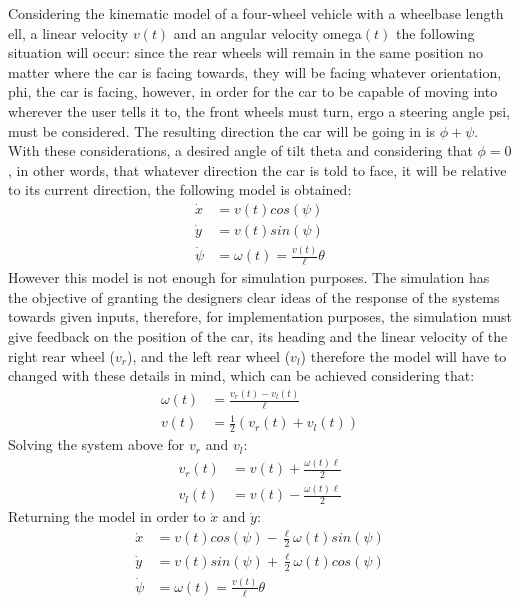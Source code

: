 Considering the kinematic model of a four-wheel vehicle with a wheelbase length \gls{ell}, a linear velocity $v(t)$ and an angular velocity \gls{omega}$(t)$ the following situation will occur: since the rear wheels will remain in the same position no matter where the car is facing towards, they will be facing whatever orientation, \gls{phi}, the car is facing, however, in order for the car to be capable of moving into wherever the user tells it to, the front wheels must turn, ergo a steering angle \gls{psi}, must be considered. The resulting direction the car will be going in is $\phi + \psi$. With these considerations, a desired angle of tilt \gls{theta} and considering that $\phi=0$, in other words, that whatever direction the car is told to face, it will be relative to its current direction, the following model is obtained:
\begin{align}
\dot{x}&=v(t) cos(\psi)\\
\dot{y}&=v(t) sin(\psi)\\
\dot{\psi}&=\omega(t)=\frac{v(t)}{\ell}\theta
\end{align}
However this model is not enough for simulation purposes. The simulation has the objective of granting the designers clear ideas of the response of the systems towards given inputs, therefore, for implementation purposes, the simulation must give feedback on the position of the car, its heading and the linear velocity of the right rear wheel ($v_r$), and the left rear wheel ($v_l$) therefore the model will have to changed with these details in mind, which can be achieved considering that:
\begin{align}
\omega(t)&=\frac{v_r(t)-v_l(t)}{\ell}\\
v(t)&=\frac{1}{2}(v_r(t)+v_l(t))
\end{align}
Solving the system above for $v_r$ and $v_l$:
\begin{align}
v_ r(t)&=v(t)+ \frac{\omega(t)\ell}{2}\\
v_l(t)&=v(t)-\frac{\omega(t)\ell}{2}
\end{align}
Returning the model in order to $\dot{x}$ and $ \dot{y}$:
\begin{align}
\dot{x}&=v(t) cos(\psi)-\frac{\ell}{2}\omega(t) sin(\psi)\\
\dot{y}&=v(t) sin(\psi)+\frac{\ell}{2}\omega(t) cos(\psi)\\
\dot{\psi}&=\omega(t)=\frac{v(t)}{\ell}\theta
\label{equ:sysModel}
\end{align}
